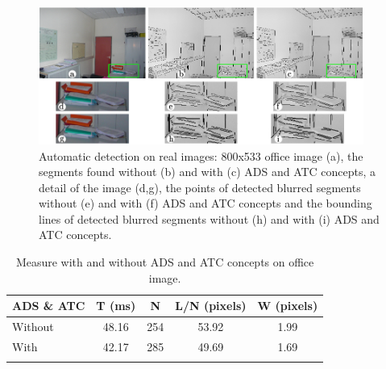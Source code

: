 \documentclass[11pt]{article}
\begin{document}
\pagebreak


\begin{figure}
  \begin{center}
  \includegraphics[width=0.95\textwidth]{Images/expe1.png}
  \end{center}
  \caption{Automatic detection on real images: 800x533 office image (a),
    the segments found without (b) and with (c) ADS and ATC concepts,
    a detail of the image (d,g),
    the points of detected blurred segments without (e) and with (f) ADS
    and ATC concepts and the bounding lines of detected blurred segments
    without (h) and with (i) ADS and ATC concepts.}
  \label{fig:office}
\end{figure}



\begin{longtable}[]{l|cccc}
\toprule
\begin{minipage}[b]{0.18\columnwidth}\raggedright
ADS \& ATC \strut
\end{minipage} & \begin{minipage}[b]{0.14\columnwidth}\centering
T (ms) \strut
\end{minipage} & \begin{minipage}[b]{0.14\columnwidth}\centering
N \strut
\end{minipage} & \begin{minipage}[b]{0.14\columnwidth}\centering
L/N (pixels) \strut
\end{minipage} & \begin{minipage}[b]{0.14\columnwidth}\centering
W (pixels) \strut
\end{minipage} \tabularnewline
\midrule 
Without & 48.16 & 254 & 53.92 & 1.99 \tabularnewline
With & 42.17 & 285 & 49.69 & 1.69 \tabularnewline
\bottomrule
\caption{Measure with and without ADS and ATC concepts on office image.}
\label{tab:office}
\end{longtable}

\pagebreak
\end{document}
